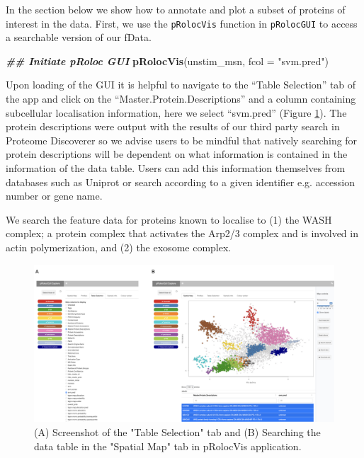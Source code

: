\documentclass[9pt,a4paper,]{extarticle}
\newenvironment{Shaded}{\begin{snugshade}}{\end{snugshade}}
\newcommand{\AttributeTok}[1]{\textcolor[rgb]{0.13,0.29,0.53}{#1}}
\newcommand{\DocumentationTok}[1]{\textcolor[rgb]{0.56,0.35,0.01}{\textbf{\textit{#1}}}}
\newcommand{\FunctionTok}[1]{\textcolor[rgb]{0.13,0.29,0.53}{\textbf{#1}}}
\newcommand{\NormalTok}[1]{#1}
\newcommand{\StringTok}[1]{\textcolor[rgb]{0.31,0.60,0.02}{#1}}
\begin{document}
In the section below we show how to annotate and plot a subset of proteins of
interest in the data. First, we use the \texttt{pRolocVis} function in \texttt{pRolocGUI} to
access a searchable version of our fData.

\begin{Shaded}
\begin{Highlighting}[]
\DocumentationTok{\#\# Initiate pRoloc GUI}
\FunctionTok{pRolocVis}\NormalTok{(unstim\_msn, }\AttributeTok{fcol =} \StringTok{"svm.pred"}\NormalTok{)}
\end{Highlighting}
\end{Shaded}

Upon loading of the GUI it is helpful to navigate to the ``Table Selection'' tab
of the app and click on the ``Master.Protein.Descriptions'' and a column
containing subcellular localisation information, here we select ``svm.pred''
(Figure \ref{fig:pRolocvis-complex-gui}). The
protein descriptions were output with the results of our third party search in
Proteome Discoverer so we advise users to be mindful that natively searching for
protein descriptions will be dependent on what information is contained in the
information of the data table. Users can add this information themselves from
databases such as Uniprot or search according to a given identifier e.g.
accession number or gene name.

We search the feature data for proteins known to localise to (1) the WASH complex;
a protein complex that activates the Arp2/3 complex and is involved in actin
polymerization, and (2) the exosome complex.

\begin{figure}[H]

{\centering \includegraphics[width=1\linewidth,]{figs/screenshot_complexes_gui} 

}

\caption{(A) Screenshot of the "Table Selection" tab and (B) Searching the data table in the "Spatial Map" tab in pRolocVis application.}\label{fig:pRolocvis-complex-gui}
\end{figure}
\end{document}
